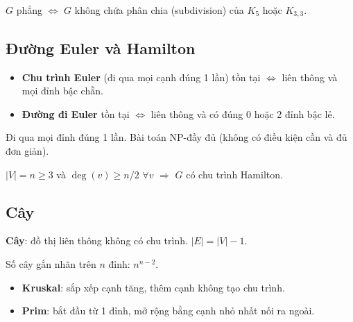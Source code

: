 \documentclass[12pt,a4paper]{article}
\begin{document}
\begin{dinhly}[title={Kuratowski}]
  $G$ phẳng $\Leftrightarrow$ $G$ không chứa phân chia (subdivision) của $K_5$ hoặc $K_{3,3}$.
\end{dinhly}

\subsection{Đường Euler và Hamilton}

\begin{dinhly}[title={Đường đi / chu trình Euler}]
  \begin{itemize}
    \item \textbf{Chu trình Euler} (đi qua mọi cạnh đúng 1 lần) tồn tại $\Leftrightarrow$ liên thông và mọi đỉnh bậc chẵn.
    \item \textbf{Đường đi Euler} tồn tại $\Leftrightarrow$ liên thông và có đúng 0 hoặc 2 đỉnh bậc lẻ.
  \end{itemize}
\end{dinhly}

\begin{dinhnghia}[title={Đường Hamilton}]
  Đi qua mọi đỉnh đúng 1 lần. Bài toán NP-đầy đủ (không có điều kiện cần và đủ đơn giản).
\end{dinhnghia}

\begin{dinhly}[title={Điều kiện đủ (Dirac)}]
  $|V| = n \ge 3$ và $\deg(v) \ge n/2$ $\forall v$ $\Rightarrow$ $G$ có chu trình Hamilton.
\end{dinhly}

\subsection{Cây}

\begin{dinhnghia}
  \textbf{Cây}: đồ thị liên thông không có chu trình. $|E| = |V| - 1$.
\end{dinhnghia}

\begin{dinhly}[title={Cayley}]
  Số cây gắn nhãn trên $n$ đỉnh: $n^{n-2}$.
\end{dinhly}

\begin{phuongphap}[title={Cây khung nhỏ nhất (MST)}]
  \begin{itemize}
    \item \textbf{Kruskal}: sắp xếp cạnh tăng, thêm cạnh không tạo chu trình.
    \item \textbf{Prim}: bắt đầu từ 1 đỉnh, mở rộng bằng cạnh nhỏ nhất nối ra ngoài.
  \end{itemize}
\end{phuongphap}
\end{document}
